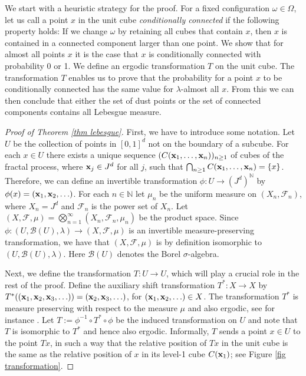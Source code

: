 \documentclass[11pt,a4paper]{article}
\newcommand{\IN}{\ensuremath{\mathbb{N}}}
\newcommand{\FF}{\ensuremath{\mathcal{F}}}
\newcommand{\BB}{\ensuremath{\mathcal{B}}}
\theoremstyle{remark}
\begin{document}
We start with a heuristic strategy for the proof. For a fixed configuration $\omega \in \Omega$, let us call a point $x$ in the unit cube \emph{conditionally connected} if the following property holds: If we change $\omega$ by retaining all cubes that contain $x$, then $x$ is contained in a connected component larger than one point. We show that for almost all points $x$ it is the case that $x$ is conditionally connected with probability 0 or 1. We define an ergodic transformation $T$ on the unit cube. The transformation $T$ enables us to prove that the probability for a point $x$ to be conditionally connected has the same value for $\lambda$-almost all $x$.  From this we can then conclude that either the set of dust points or the set of connected components contains all Lebesgue measure.


\begin{proof}[Proof of Theorem \ref{thm lebesgue}]
First, we have to introduce some notation. Let $U$ be the collection of points in $[0,1]^d$ not on the boundary of a subcube. For each $x\in U$ there exists a unique sequence $(C({\bf x}_1,\ldots,{\bf x}_n))_{n\geq 1}$ of cubes of the fractal process, where ${\bf x}_j\in J^d$ for all $j$, such that $\bigcap_{n\geq 1} C({\bf x}_1,\ldots,{\bf x}_n) = \{ x \}$. Therefore, we can define an invertible transformation $\phi : U \to (J^d)^{\IN}$ by $\phi(x) = ({\bf x}_1,{\bf x}_2,\ldots)$. For each $n \in \IN$ let $\mu_n$ be the uniform measure on $(X_n,\FF_n)$, where $X_n= J^d$ and $\FF_n$ is the power set of $X_n$. Let $(X,\FF,\mu)=\bigotimes_{n=1}^{\infty}(X_n,\FF_n,\mu_n)$ be the product space. Since $\phi : (U,\BB(U),\lambda) \to (X,\FF,\mu)$ is an invertible measure-preserving transformation, we have that $(X,\FF,\mu)$ is by definition isomorphic to $(U,\BB(U),\lambda)$. Here $\BB(U)$ denotes the Borel $\sigma$-algebra.

Next, we define the transformation $T:U\to U$, which will play a crucial role in the rest of the proof. Define the auxiliary shift transformation $T^* : X\to X$ by $T^*(({\bf x}_1,{\bf x}_2,{\bf x}_3,\ldots)) = ({\bf x}_2,{\bf x}_3,\ldots)$, for $({\bf x}_1,{\bf x}_2,\ldots)\in X$. The transformation $T^*$ is measure preserving with respect to the measure $\mu$ and also ergodic, see for instance \cite{Wal}. Let $T := \phi^{-1} \circ T^* \circ \phi$ be the induced transformation on $U$ and note that $T$ is isomorphic to $T^*$ and hence also ergodic. Informally, $T$ sends a point $x\in U$ to the point $Tx$, in such a way that the relative position of $Tx$ in the unit cube is the same as the relative position of $x$ in its level-1 cube $C({\bf x}_1)$; see Figure \ref{fig transformation}.


\end{proof}
\end{document}
